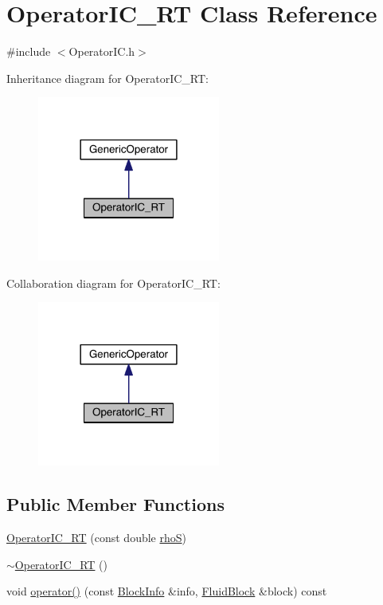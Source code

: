 \hypertarget{class_operator_i_c___r_t}{}\section{Operator\+I\+C\+\_\+\+R\+T Class Reference}
\label{class_operator_i_c___r_t}


{\ttfamily \#include $<$Operator\+I\+C.\+h$>$}



Inheritance diagram for Operator\+I\+C\+\_\+\+R\+T\+:\nopagebreak
\begin{figure}[H]
\begin{center}
\leavevmode
\includegraphics[width=170pt]{d3/d54/class_operator_i_c___r_t__inherit__graph}
\end{center}
\end{figure}


Collaboration diagram for Operator\+I\+C\+\_\+\+R\+T\+:\nopagebreak
\begin{figure}[H]
\begin{center}
\leavevmode
\includegraphics[width=170pt]{d9/d35/class_operator_i_c___r_t__coll__graph}
\end{center}
\end{figure}
\subsection*{Public Member Functions}
\begin{DoxyCompactItemize}
\item 
\hyperlink{class_operator_i_c___r_t_ad95cfbf4463a873848a281e3fbbab8f9}{Operator\+I\+C\+\_\+\+R\+T} (const double \hyperlink{class_operator_i_c___r_t_a20888d7f5cbc228ac669fc0cb0be667e}{rho\+S})
\item 
\hyperlink{class_operator_i_c___r_t_a89b4c249074ed926302a4cbc228fe498}{$\sim$\+Operator\+I\+C\+\_\+\+R\+T} ()
\item 
void \hyperlink{class_operator_i_c___r_t_a76857e9f8973fcbfcc8b26e95f55f776}{operator()} (const \hyperlink{struct_block_info}{Block\+Info} \&info, \hyperlink{struct_fluid_block}{Fluid\+Block} \&block) const 
\end{DoxyCompactItemize}
